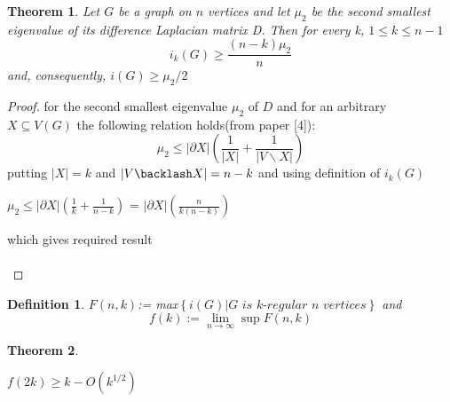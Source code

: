 \documentclass[oneside]{book}
\newtheorem{theorem}{Theorem}[section]
\newtheorem{mydef}{Definition}
\begin{document}
\begin{theorem} 


 Let $G$ be a graph on $n$ vertices and let $\mu_{2}$ be the second smallest eigenvalue of its difference Laplacian matrix D. Then for every k, 
$1 \leq k \leq n-1$
$$
i_{k}(G) \geq \frac{(n-k) \mu_{2}}{n}
$$
and, consequently, $i(G) \geq \mu_{2} / 2$ \par

\end{theorem} 
\begin{proof}


for the second smallest eigenvalue $\mu_{2}$ of $D$ and for an arbitrary $X \subseteq V(G)$ the following relation holds(from paper [4]):
$$
\mu_{2} \leq|\partial X|\left(\frac{1}{|X|}+\frac{1}{|V \backslash X|}\right)
$$
putting $|X| = k $ and $|V\backlash X| = n-k $ and using definition of $i_k(G)$ 

 $ \mu_{2} \leq|\partial X|\left(\frac{1}{k}+\frac{1}{n-k}\right)$ = $|\partial X|\left(\frac{n}{k(n-k)}\right) $ \par
 which gives required result\\\\
 \end{proof} 
 
 \begin{mydef}
 
 
$F(n, k)$:= max$\left\{i(G)| \textit{G is k-regular  n vertices} \right\}$ 
and
$$
f(k):=\lim _{n \rightarrow \infty} \sup F(n, k)
$$
\end{mydef}
 
 
\begin{theorem}
 
 
  \begin{center}
    $f(2 k) \geq k-O\left(k^{1 / 2}\right)$ 
     \end{center}
    \end{theorem}
   
\end{document}
